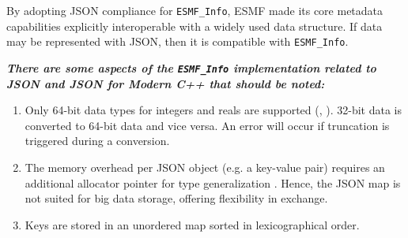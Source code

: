By adopting JSON compliance for \texttt{ESMF\_Info}, ESMF made its core metadata capabilities explicitly interoperable with a widely used data structure. If data may be represented with JSON, then it is compatible with \texttt{ESMF\_Info}.

\textbf{\textit{There are some aspects of the \texttt{ESMF\_Info} implementation related to JSON and \textit{JSON for Modern C++} that should be noted:}}
\begin{enumerate}
    \item Only 64-bit data types for integers and reals are supported (\cite{json_for_modern_cpp_64bit_int}, \cite{json_for_modern_cpp_64bit_float}). 32-bit data is converted to 64-bit data and vice versa. An error will occur if truncation is triggered during a conversion.
    \item The memory overhead per JSON object (e.g. a key-value pair) requires an additional allocator pointer for type generalization \cite{json_for_modern_cpp_memory_overhead}. Hence, the JSON map is not suited for big data storage, offering flexibility in exchange.
    \item Keys are stored in an unordered map sorted in lexicographical order.
\end{enumerate}

